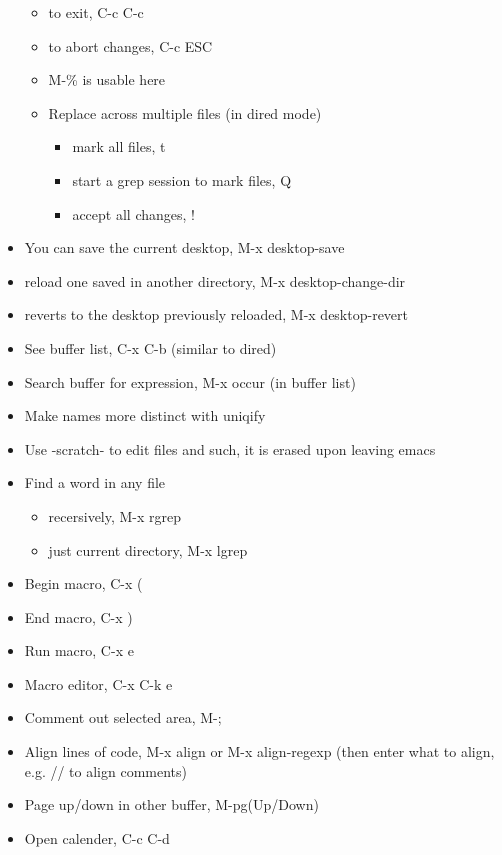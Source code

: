 \documentclass[11pt]{article}
\begin{document}
\begin{itemize}
\begin{itemize}
\item to exit, C-c C-c
\item to abort changes, C-c ESC
\item M-\% is usable here
\item Replace across multiple files (in dired mode)
\begin{itemize}
\item mark all files, t
\item start a grep session to mark files, Q
\item accept all changes, !
\end{itemize}
\end{itemize}
\item You can save the current desktop, M-x desktop-save
\item reload one saved in another directory, M-x desktop-change-dir
\item reverts to the desktop previously reloaded, M-x desktop-revert
\item See buffer list, C-x C-b (similar to dired)
\item Search buffer for expression, M-x occur (in buffer list)
\item Make names more distinct with uniqify
\item Use -scratch- to edit files and such, it is erased upon leaving emacs
\item Find a word in any file
\begin{itemize}
\item recersively, M-x rgrep
\item just current directory, M-x lgrep
\end{itemize}
\item Begin macro, C-x (
\item End macro, C-x )
\item Run macro, C-x e
\item Macro editor, C-x C-k e
\item Comment out selected area, M-;
\item Align lines of code, M-x align or M-x align-regexp (then enter what to align, e.g. // to align comments)
\item Page up/down in other buffer, M-pg(Up/Down)
\item Open calender, C-c C-d
\end{itemize}
\end{document}
